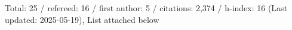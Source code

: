 Total: 25 / refereed: 16 / first author: 5 / citations: 2,374 / h-index: 16 (Last updated: 2025-05-19), List attached below
